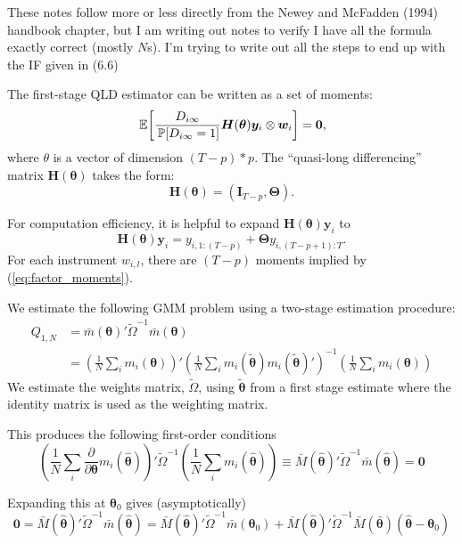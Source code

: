\documentclass[12pt]{article}
\begin{document}
These notes follow more or less directly from the Newey and McFadden (1994) handbook chapter, but I am writing out notes to verify I have all the formula exactly correct (mostly $N$s). I'm trying to write out all the steps to end up with the IF given in (6.6)

The first-stage QLD estimator can be written as a set of moments:
\begin{equation}\label{eq:factor_moments}
  \expec{
    \frac{D_{i\infty}}{\prob{D_{i\infty} = 1}} \bm H(\bm{\theta}) \bm y_i \otimes \bm w_i
  } = \bm 0,
\end{equation}
where $\theta$ is a vector of dimension $(T - p) * p$. 
The ``quasi-long differencing'' matrix $\bm H(\bm{\theta})$ takes the form:
\begin{equation}
  \bm H(\bm{\theta}) = (\bm I_{T-p}, \bm \Theta).
\end{equation}

For computation efficiency, it is helpful to expand $\bm H(\bm{\theta}) \bm y_i$ to
$$
  \bm H(\bm{\theta}) \bm y_i = y_{i, 1:(T-p)} + \bm \Theta y_{i, (T-p+1):T}.
$$
For each instrument $w_{i,l}$, there are $(T-p)$ moments implied by (\ref{eq:factor_moments}). 

We estimate the following  GMM problem using a two-stage estimation procedure:
\begin{align*}
  Q_{1,N} &= \bar{m}(\bm{\theta})' \tilde{\Omega}^{-1} \bar{m}(\bm{\theta}) \\
  &= \left(\frac{1}{N} \sum_i m_i(\bm{\theta}) \right)' 
     \left(\frac{1}{N} \sum_i m_i(\tilde{\bm{\theta}}) m_i(\tilde{\bm{\theta}})' \right)^{-1} 
     \left(\frac{1}{N} \sum_i m_i(\bm{\theta}) \right) 
\end{align*}
We estimate the weights matrix, $\tilde{\Omega}$, using $\tilde{\bm{\theta}}$ from a first stage estimate where the identity matrix is used as the weighting matrix.

This produces the following first-order conditions
$$
  \left(\frac{1}{N} \sum_i \frac{\partial}{\partial \bm{\theta}} m_i(\hat{\bm{\theta}}) \right)' \tilde{\Omega}^{-1} \left(\frac{1}{N} \sum_i m_i(\hat{\bm{\theta}}) \right) \equiv
  \bar{M}(\hat{\bm{\theta}})' \tilde{\Omega}^{-1} \bar{m}(\hat{\bm{\theta}}) = \bm{0}
$$

Expanding this at $\bm{\theta}_0$ gives (asymptotically)
$$
  \bm{0} = \bar{M}(\hat{\bm{\theta}})' \tilde{\Omega}^{-1} \bar{m}(\hat{\bm{\theta}}) = 
  \bar{M}(\hat{\bm{\theta}})' \tilde{\Omega}^{-1} \bar{m}(\bm{\theta}_0) +
  \bar{M}(\hat{\bm{\theta}})' \tilde{\Omega}^{-1} \bar{M}(\bar{\bm{\theta}}) \left( \hat{\bm{\theta}} - \bm{\theta}_0 \right)
$$
\end{document}
